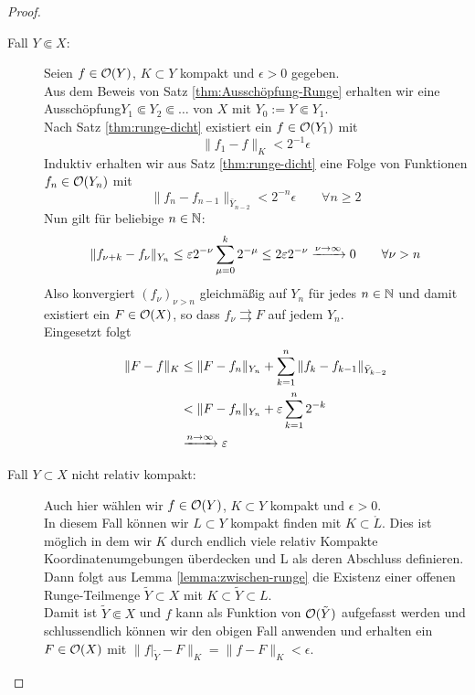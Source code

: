 \begin{proof}
  \begin{description}
  \item[Fall $Y \Subset X$:] Seien $f \in \mathcal{O}(Y)$, $K \subset Y$
    kompakt und $\epsilon > 0$ gegeben. \\
    Aus dem Beweis von Satz \ref{thm:Ausschöpfung-Runge} erhalten wir
    eine Ausschöpfung$Y_1
    \Subset Y_2 \Subset \dots$ von $X$ mit $Y_0 := Y \Subset Y_1$. \\
    Nach Satz \ref{thm:runge-dicht} existiert ein $f \in \mathcal{O}(Y_1)$
    mit
    \[
    \|f_1 - f\|_K < 2^{-1} \epsilon
    \]
    Induktiv erhalten wir aus Satz \ref{thm:runge-dicht} eine Folge
    von Funktionen $f_n \in \mathcal{O}(Y_n)$ mit
    \[
    \|f_n - f_{n-1}\|_{\bar Y_{n-2}} < 2^{-n} \epsilon \qquad \forall
    n \geq 2
    \]
    Nun gilt für beliebige $n \in \mathbb{N}$:
    \[
    \|f_{\nu + k} - f_{\nu} \|_{Y_n} \leq \varepsilon 2^{-\nu} \sum_{\mu
      = 0}^k 2^{-\mu} \leq 2 \varepsilon 2^{-\nu} \xrightarrow{\nu \rightarrow
      \infty} 0 \qquad \forall \nu > n
    \]
    Also konvergiert $(f_\nu)_{\nu > n}$ gleichmäßig auf $Y_n$ für
    jedes $n \in \mathbb{N}$ und damit existiert ein $F \in \mathcal{O}(X)$, so dass
    $f_\nu \rightrightarrows F$ auf jedem $Y_n$. \\
    Eingesetzt folgt
    \begin{align*}
      \|F - f\|_K & \leq \|F - f_n\|_{Y_n} + \sum_{k=1}^n \|f_k -
      f_{k-1}\|_{\bar Y_{k-2}} \\
      & < \|F - f_n \|_{Y_n} + \varepsilon \sum_{k=1}^n 2^{-k} \\
      & \xrightarrow{n \rightarrow \infty} \varepsilon
    \end{align*}
  \item[Fall $Y \subset X$ nicht relativ kompakt:] Auch hier wählen
    wir $f \in \mathcal{O}(Y)$, $K \subset Y$ kompakt und $\epsilon > 0$. \\
    In diesem Fall können wir $L \subset Y$ kompakt finden mit $K \subset
    \mathring L$. Dies ist möglich in dem wir $K$ durch endlich viele relativ
    Kompakte Koordinatenumgebungen überdecken und L als deren
    Abschluss definieren. \\
    Dann folgt aus Lemma \ref{lemma:zwischen-runge} die Existenz einer
    offenen Runge-Teilmenge
    $\tilde Y \subset X$ mit $K \subset \tilde Y \subset L$. \\
    Damit ist $\tilde Y \Subset X$ und $f$ kann als Funktion von
    $\mathcal{O}(\tilde Y)$ aufgefasst werden und schlussendlich können wir
    den obigen Fall anwenden und erhalten ein $F \in \mathcal{O}(X)$ mit
    $\|f|_{\tilde Y} - F\|_K = \|f - F\|_K < \epsilon$.
  \end{description}
\end{proof}

